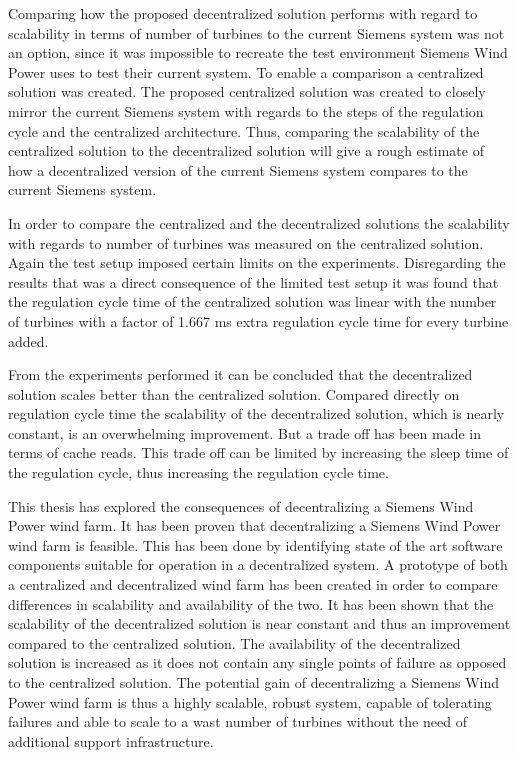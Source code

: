 Comparing how the proposed decentralized solution performs with regard to scalability in terms of number of turbines to the current Siemens system was not an option, since it was impossible to recreate the test environment Siemens Wind Power uses to test their current system. To enable a comparison a centralized solution was created. The proposed centralized solution was created to closely mirror the current Siemens system with regards to the steps of the regulation cycle and the centralized architecture. Thus, comparing the scalability of the centralized solution to the decentralized solution will give a rough estimate of how a decentralized version of the current Siemens system compares to the current Siemens system.

In order to compare the centralized and the decentralized solutions the scalability with regards to number of turbines was measured on the centralized solution. Again the test setup imposed certain limits on the experiments. Disregarding the results that was a direct consequence of the limited test setup it was found that the regulation cycle time of the centralized solution was linear with the number of turbines with a factor of 1.667 ms extra regulation cycle time for every turbine added.

From the experiments performed it can be concluded that the decentralized solution scales better than the centralized solution. Compared directly on regulation cycle time the scalability of the decentralized solution, which is nearly constant, is an overwhelming improvement. But a trade off has been made in terms of cache reads. This trade off can be limited by increasing the sleep time of the regulation cycle, thus increasing the regulation cycle time.

This thesis has explored the consequences of decentralizing a Siemens Wind Power wind farm. It has been proven that decentralizing a Siemens Wind Power wind farm is feasible. This has been done by identifying state of the art software components suitable for operation in a decentralized system. A prototype of both a centralized and decentralized wind farm has been created in order to compare differences in scalability and availability of the two. It has been shown that the scalability of the decentralized solution is near constant and thus an improvement compared to the centralized solution. The availability of the decentralized solution is increased as it does not contain any single points of failure as opposed to the centralized solution. The potential gain of decentralizing a Siemens Wind Power wind farm is thus a highly scalable, robust system, capable of tolerating failures and able to scale to a wast number of turbines without the need of additional support infrastructure.